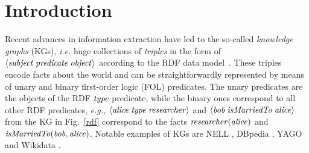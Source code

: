 \chapter{Introduction}
\label{chap:intro}

Recent advances in information extraction have led to
the so-called \emph{knowledge graphs} (KGs), \textit{i.e.} huge collections of \textit{triples} in the form
of $\langle\mathit{subject}\;\mathit{predicate}\;\mathit{object}\rangle$ according to the RDF data model~\cite{rdf}. %
These triples encode facts %
about the world and can be straightforwardly represented by means of unary and binary first-order logic (FOL) predicates.
The unary predicates are the objects of the RDF $\mathit{type}$ predicate, while the binary ones correspond to all other RDF predicates, \emph{e.g.}, $\langle\mathit{alice\;type\;researcher}\rangle$ and $\langle\mathit{bob \;isMarriedTo\;alice}\rangle$ from the KG in Fig.~\ref{rdf} %
correspond to the facts $\mathit{researcher(alice)}$  %
and $\mathit{isMarriedTo(bob,alice)}$.
Notable examples of KGs are NELL \cite{nell}, DBpedia \cite{dbp}, %
YAGO \cite{yago3} and Wikidata \cite{wikidata}. %

